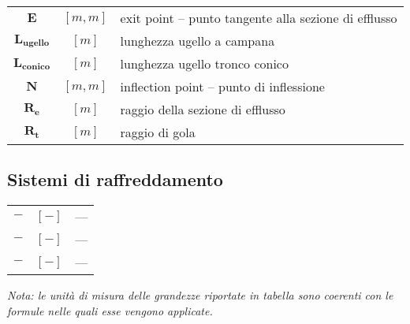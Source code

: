 \begin{multicols}{2}
\begin{tabularx}{\linewidth}{cc>{\raggedright\arraybackslash}X}
		$\bm{E}$ & $[m, m]$ & exit point – punto tangente alla sezione di efflusso  \\
		$\bm{L_{ugello}}$ & $[m]$ & lunghezza ugello a campana \\
	    $\bm{L_{conico}}$ & $[m]$ & lunghezza ugello tronco conico \\
		$\bm{N}$ & $[m, m]$ & inflection point – punto di inflessione \\
		$\bm{R_e}$ & $[m]$ & raggio della sezione di efflusso \\
        $\bm{R_t}$ & $[m]$ & raggio di gola
	\end{tabularx}

	\subsection{Sistemi di raffreddamento}
	\begin{tabularx}{\linewidth}{cc>{\raggedright\arraybackslash}X}
		$\bm{-}$ & $[-]$ & --- \\
		$\bm{-}$ & $[-]$ & --- \\
		$\bm{-}$ & $[-]$ & ---
	\end{tabularx}

\end{multicols}

\textit{Nota: le unità di misura delle grandezze riportate in tabella sono coerenti con le formule nelle quali esse vengono applicate.}